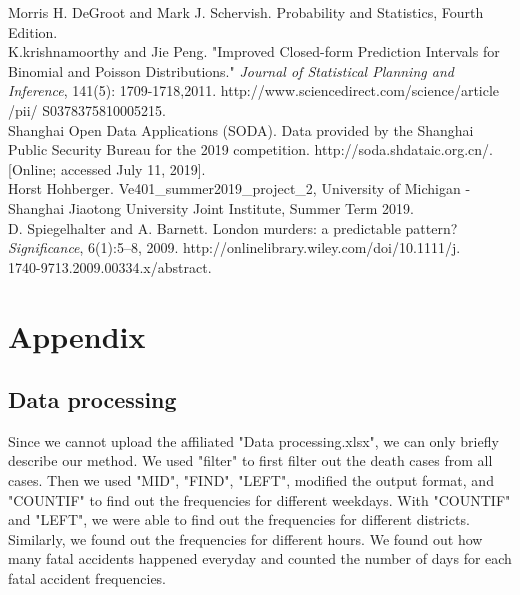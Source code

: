 \documentclass[a4paper,12pt]{article}
\begin{document}
\noindent
[3] Morris H. DeGroot and Mark J. Schervish. Probability and Statistics, Fourth \phantom{[1] }Edition.\\

\noindent[4] K.krishnamoorthy and Jie Peng. "Improved Closed-form Prediction Intervals \phantom{[1] }for Binomial and Poisson Distributions." \emph{Journal of Statistical Planning and \phantom{[1] }Inference}, 141(5): 1709-1718,2011. http://www.sciencedirect.com/science/article\\ \phantom{[1] }/pii/ S0378375810005215.\\

\noindent[5] Shanghai Open Data Applications (SODA). Data provided by the Shanghai \phantom{[1] }Public Security Bureau for the
2019 competition. http://soda.shdataic.org.cn/. \phantom{[1] }[Online; accessed July 11, 2019].\\

\noindent [6] Horst Hohberger. Ve401\_summer2019\_project\_2, University of Michigan - \phantom{[1] }Shanghai Jiaotong University
Joint Institute, Summer Term 2019.\\

\noindent [7] D. Spiegelhalter and A. Barnett. London murders: a predictable pattern? \phantom{[1] }\emph {Significance}, 6(1):5–8, 2009.
http://onlinelibrary.wiley.com/doi/10.1111/j.\\\phantom{[1] }1740-9713.2009.00334.x/abstract.
\newpage
\section{Appendix}
\subsection{Data processing}
\noindent Since we cannot upload the affiliated "Data processing.xlsx", we can only briefly describe our method. We used "filter" to first filter out the death cases from all cases. Then we used "MID", "FIND", "LEFT", modified the output format, and "COUNTIF" to find out the frequencies for different weekdays. With "COUNTIF" and "LEFT", we were able to find out the frequencies for different districts. Similarly, we found out the frequencies for different hours. We found out how many fatal accidents happened everyday and counted the number of days for each fatal accident frequencies.
\end{document}
